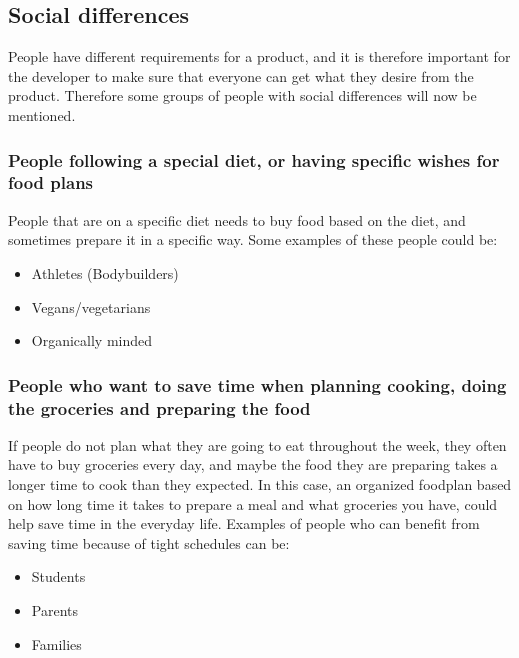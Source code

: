 \subsection{Social differences}

People have different requirements for a product, and it is therefore important for the developer to make sure that everyone can get what they desire from the product. Therefore some groups of people with social differences will now be mentioned.

\subsubsection{People following a special diet, or having specific wishes for food plans}
People that are on a specific diet needs to buy food based on the diet, and sometimes prepare it in a specific way.
Some examples of these people could be:
\begin{itemize}
\item Athletes (Bodybuilders)
\item Vegans/vegetarians
\item Organically minded
\end{itemize}

\subsubsection{People who want to save time when planning cooking, doing the groceries and preparing the food} 
If people do not plan what they are going to eat throughout the week, they often have to buy groceries every day, and maybe the food they are preparing takes a longer time to cook than they expected. In this case, an organized foodplan based on how long time it takes to prepare a meal and what groceries you have, could help save time in the everyday life. Examples of people who can benefit from saving time because of tight schedules can be:
\begin{itemize}
\item Students
\item Parents
\item Families
\end{itemize}

